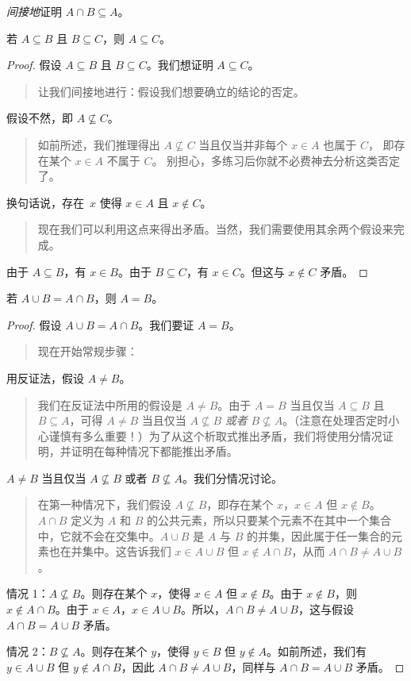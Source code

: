 \documentclass[../../../include/open-logic-section]{subfiles}
\begin{document}
\begin{prob}
\emph{间接地}证明 $A \cap B \subseteq A$。
\end{prob}

\begin{prop}
若 $A \subseteq B$ 且 $B \subseteq C$，则 $A \subseteq C$。
\end{prop}

\begin{proof}
  假设 $A \subseteq B$ 且 $B \subseteq C$。我们想证明 $A \subseteq C$。
  \begin{quote}
    让我们间接地进行：假设我们想要确立的结论的否定。
  \end{quote}
  假设不然，即 $A \nsubseteq C$。
  \begin{quote}
    如前所述，我们推理得出 $A \nsubseteq C$ 当且仅当并非每个 $x \in A$ 也属于 $C$，
    即存在某个 $x \in A$ 不属于 $C$。
    别担心，多练习后你就不必费神去分析这类否定了。
  \end{quote}
  换句话说，存在~$x$ 使得 $x \in A$ 且 $x \notin C$。
  \begin{quote}
    现在我们可以利用这点来得出矛盾。当然，我们需要使用其余两个假设来完成。
  \end{quote}
  由于 $A \subseteq B$，有 $x \in B$。由于 $B \subseteq C$，有 $x \in C$。但这与 $x \notin C$ 矛盾。
\end{proof}

\begin{prop}
若 $A \cup B = A \cap B$，则 $A = B$。
\end{prop}

\begin{proof}
  假设 $A \cup B = A \cap B$。我们要证 $A = B$。
  \begin{quote}
    现在开始常规步骤：
  \end{quote}
  用反证法，假设 $A \neq B$。
  \begin{quote}
    我们在反证法中所用的假设是 $A \neq B$。由于 $A = B$ 当且仅当 $A \subseteq B$ 且 $B \subseteq A$，可得 $A \neq B$ 当且仅当 $A \nsubseteq B$ \emph{或者} $B \nsubseteq A$。（注意在处理否定时小心谨慎有多么重要！{}）为了从这个析取式推出矛盾，我们将使用分情况证明，并证明在每种情况下都能推出矛盾。
  \end{quote}
  $A \neq B$ 当且仅当 $A \nsubseteq B$ 或者 $B \nsubseteq A$。我们分情况讨论。
  \begin{quote}
    在第一种情况下，我们假设 $A \nsubseteq B$，即存在某个 $x$，$x \in A$ 但 $x \notin B$。$A \cap B$ 定义为 $A$ 和 $B$ 的公共元素，所以只要某个元素不在其中一个集合中，它就不会在交集中。$A \cup B$ 是 $A$ 与 $B$ 的并集，因此属于任一集合的元素也在并集中。这告诉我们 $x \in A \cup B$ 但 $x \notin A \cap B$，从而 $A \cap B \neq A \cup B$。
  \end{quote}

  情况 1：$A \nsubseteq B$。则存在某个 $x$，使得 $x \in A$ 但 $x \notin B$。由于 $x \notin B$，则 $x \notin A \cap B$。由于 $x \in A$，$x \in A \cup B$。所以，$A \cap B \neq A \cup B$，这与假设 $A \cap B = A \cup B$ 矛盾。

  情况 2：$B \nsubseteq A$。则存在某个 $y$，使得 $y \in B$ 但 $y \notin A$。如前所述，我们有 $y \in A \cup B$ 但 $y \notin A \cap B$，因此 $A \cap B \neq A \cup B$，同样与 $A \cap B = A \cup B$ 矛盾。
\end{proof}
\end{document}
